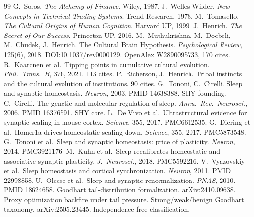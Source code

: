 \documentclass[11pt]{article}
\begin{document}
\begin{thebibliography}{99}
 G.\ Soros. \textit{The Alchemy of Finance}. Wiley, 1987.
 J.\ Welles Wilder. \textit{New Concepts in Technical Trading Systems}. Trend Research, 1978.
 M.\ Tomasello. \textit{The Cultural Origins of Human Cognition}. Harvard UP, 1999.
 J.\ Henrich. \textit{The Secret of Our Success}. Princeton UP, 2016.
 M.\ Muthukrishna, M.\ Doebeli, M.\ Chudek, J.\ Henrich. The Cultural Brain Hypothesis. \textit{Psychological Review}, 125(6), 2018. DOI:10.1037/rev0000129. OpenAlex W2890095733, 170 cites.
 R.\ Kaaronen et al.\ Tipping points in cumulative cultural evolution. \textit{Phil.\ Trans.\ B}, 376, 2021. 113 cites.
 P.\ Richerson, J.\ Henrich. Tribal instincts and the cultural evolution of institutions. 90 cites.
 G.\ Tononi, C.\ Cirelli. Sleep and synaptic homeostasis. \textit{Neuron}, 2003. PMID 14638388. SHY founding.
 C.\ Cirelli. The genetic and molecular regulation of sleep. \textit{Annu.\ Rev.\ Neurosci.}, 2006. PMID 16376591. SHY core.
 L.\ De Vivo et al.\ Ultrastructural evidence for synaptic scaling in mouse cortex. \textit{Science}, 355, 2017. PMC6612535.
 G.\ Diering et al.\ Homer1a drives homeostatic scaling-down. \textit{Science}, 355, 2017. PMC5873548.
 G.\ Tononi et al.\ Sleep and synaptic homeostasis: price of plasticity. \textit{Neuron}, 2014. PMC3921176.
 M.\ Kuhn et al.\ Sleep recalibrates homeostatic and associative synaptic plasticity. \textit{J.\ Neurosci.}, 2018. PMC5592216.
 V.\ Vyazovskiy et al.\ Sleep homeostasis and cortical synchronization. \textit{Neuron}, 2011. PMID 22998858.
 U.\ Olcese et al.\ Sleep and synaptic renormalization. \textit{PNAS}, 2010. PMID 18624658.
 Goodhart tail-distribution formalization. arXiv:2410.09638. Proxy optimization backfire under tail pressure.
 Strong/weak/benign Goodhart taxonomy. arXiv:2505.23445. Independence-free classification.

\end{thebibliography}
\end{document}
